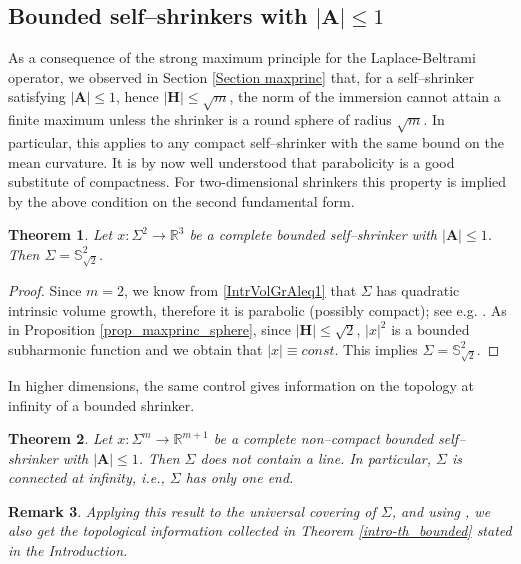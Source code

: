 \documentclass[11pt,leqno]{amsart}\usepackage{amsmath}
\newtheorem{theorem}{Theorem}
\newtheorem{remark}[theorem]{Remark}
\numberwithin{equation}{section}
\begin{document}
\subsection{Bounded self--shrinkers with $|\mathbf{A}|\leq 1$} \label{Section A1}
As a consequence of the strong maximum principle for the Laplace-Beltrami operator, we observed in Section \ref{Section maxprinc} that, for a self--shrinker satisfying $|\mathbf{A}|\leq 1$, hence $|\mathbf{H}|\leq \sqrt{m}$, the norm of the immersion cannot attain a finite maximum unless the shrinker is a round sphere of radius $\sqrt{m}$. In particular, this applies to any compact self--shrinker with the same bound on the mean curvature. It is by now well understood that parabolicity is a good substitute of compactness. For two-dimensional shrinkers this property is implied by the above condition on the second fundamental form.

\begin{theorem}
Let $x:\Sigma^2\to\mathbb{R}^3$ be a complete bounded self--shrinker with $|\mathbf{A}|\leq1$. Then $\Sigma=\mathbb{S}^{2}_{\sqrt{2}}$.
\end{theorem}

\begin{proof}
Since $m=2$, we know from \eqref{IntrVolGrAleq1} that $\Sigma$ has quadratic intrinsic volume growth, therefore it is parabolic (possibly compact); see e.g. \cite{Gr-BAMS}. As in Proposition \ref{prop_maxprinc_sphere}, since $|\mathbf{H}|\leq\sqrt{2}$,  $|x|^2$ is a bounded subharmonic function and we obtain that $|x|\equiv const$. This implies $\Sigma=\mathbb{S}^{2}_{\sqrt{2}}$.
\end{proof}

In higher dimensions, the same control gives information on the topology at infinity of a bounded shrinker.

\begin{theorem}
\label{OneEnd} Let $x:\Sigma^{m}\to\mathbb{R}^{m+1}$ be a complete
non--compact bounded self--shrinker with $|\mathbf{A}|\leq1$. Then $\Sigma$
does not contain a line. In particular, $\Sigma$ is connected at infinity,
i.e., $\Sigma$ has only one end.
\end{theorem}

\begin{remark}
\rm{ Applying this result to the universal covering of $\Sigma$, and
using \cite{So-Indiana, WeWa-JDG, Y}, we also get the topological information
collected in Theorem \ref{intro-th_bounded} stated in the Introduction.}
\end{remark}
\end{document}

